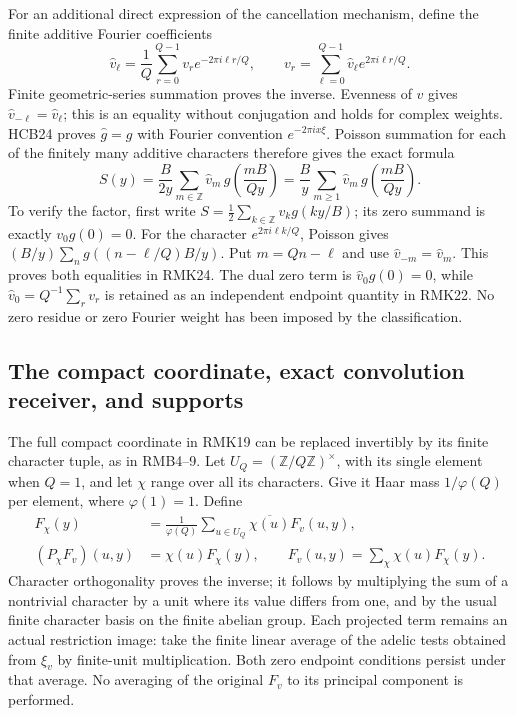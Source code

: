 For an additional direct expression of the cancellation mechanism,
define the finite additive Fourier coefficients
\begin{equation}\tag{RMK23}
 \widehat v_\ell=\frac1Q\sum_{r=0}^{Q-1}
       v_r e^{-2\pi i\ell r/Q},\qquad
 v_r=\sum_{\ell=0}^{Q-1}\widehat v_\ell e^{2\pi i\ell r/Q}.
\end{equation}
Finite geometric-series summation proves the inverse. Evenness of
$v$ gives $\widehat v_{-\ell}=\widehat v_\ell$; this is an equality
without conjugation and holds for complex weights. HCB24 proves
$\widehat g=g$ with Fourier convention $e^{-2\pi i x\xi}$.
Poisson summation for each of the finitely many additive characters
therefore gives the exact formula
\begin{equation}\tag{RMK24}
 S(y)=\frac{B}{2y}\sum_{m\in\mathbb Z}
       \widehat v_m\,g\left(\frac{mB}{Qy}\right)
     =\frac By\sum_{m\geq1}
       \widehat v_m\,g\left(\frac{mB}{Qy}\right).
\end{equation}
To verify the factor, first write $S=\frac12\sum_{k\in\mathbb Z}
v_kg(ky/B)$; its zero summand is exactly $v_0g(0)=0$.
For the character $e^{2\pi i\ell k/Q}$, Poisson gives
$(B/y)\sum_n g((n-\ell/Q)B/y)$. Put $m=Qn-\ell$ and use
$\widehat v_{-m}=\widehat v_m$. This proves both equalities in
RMK24. The dual zero term is $\widehat v_0g(0)=0$, while
$\widehat v_0=Q^{-1}\sum_rv_r$ is retained as an independent
endpoint quantity in RMK22. No zero residue or zero Fourier weight
has been imposed by the classification.

\subsection{The compact coordinate, exact convolution receiver, and supports}

The full compact coordinate in RMK19 can be replaced invertibly by
its finite character tuple, as in RMB4--9. Let $U_Q=(\mathbb Z/Q
\mathbb Z)^\times$, with its single element when $Q=1$, and let
$\chi$ range over all its characters. Give it Haar mass
$1/\varphi(Q)$ per element, where $\varphi(1)=1$. Define
\begin{equation}\tag{RMK25}
\begin{split}
 F_\chi(y)&=\frac1{\varphi(Q)}\sum_{u\in U_Q}
                \overline{\chi(u)}F_v(u,y),\\
 (P_\chi F_v)(u,y)&=\chi(u)F_\chi(y),\qquad
 F_v(u,y)=\sum_\chi\chi(u)F_\chi(y).
\end{split}
\end{equation}
Character orthogonality proves the inverse; it follows by multiplying
the sum of a nontrivial character by a unit where its value differs
from one, and by the usual finite character basis on the finite
abelian group. Each projected term remains an actual restriction
image: take the finite linear average of the adelic tests obtained
from $\xi_v$ by finite-unit multiplication. Both zero endpoint
conditions persist under that average. No averaging of the original
$F_v$ to its principal component is performed.

